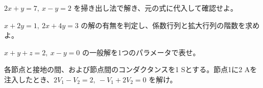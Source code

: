 \documentclass[11pt]{article}
\begin{document}

\problem[一意解]
$2x+y=7,\ x-y=2$ を掃き出し法で解き、元の式に代入して確認せよ。
\workspace{38mm}

\problem[解の存在]
$x+2y=1,\ 2x+4y=3$ の解の有無を判定し、係数行列と拡大行列の階数を求めよ。
\workspace{38mm}
\newpage

\problem[自由変数]
$x+y+z=2,\ x-y=0$ の一般解を1つのパラメータで表せ。
\workspace{38mm}

\problem[節点電圧]
各節点と接地の間、および節点間のコンダクタンスを1 Sとする。節点1に2 Aを注入したとき、$2V_1-V_2=2,\ -V_1+2V_2=0$ を解け。
\workspace{38mm}
\end{document}
